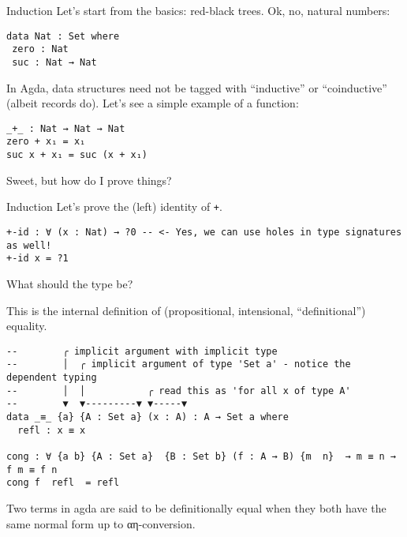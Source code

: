 \documentclass[t,aspectratio=169,9pt]{beamer}
\begin{document}
\begin{frame}{Induction}
  Let's start from the basics: red-black trees. Ok, no, natural numbers:
\begin{verbatim}
data Nat : Set where
 zero : Nat
 suc : Nat → Nat
\end{verbatim}
  In Agda, data structures need not be tagged with ``inductive'' or
  ``coinductive'' (albeit records do).
  Let's see a simple example of a function:
\begin{verbatim}
_+_ : Nat → Nat → Nat
zero + x₁ = x₁
suc x + x₁ = suc (x + x₁)
\end{verbatim}
  Sweet, but how do I prove things?
\end{frame}

\begin{frame}[fragile]{Induction}
  Let's prove the (left) identity of \texttt{+}.
\begin{verbatim}
+-id : ∀ (x : Nat) → ?0 -- <- Yes, we can use holes in type signatures as well!
+-id x = ?1
\end{verbatim}
What should the type be?

This is the internal definition of (propositional, intensional, ``definitional'') equality.
\begin{verbatim}
--        ╭ implicit argument with implicit type
--        │  ╭ implicit argument of type 'Set a' - notice the dependent typing
--        │  │           ╭ read this as 'for all x of type A'
--        ▼  ▼---------▼ ▼-----▼
data _≡_ {a} {A : Set a} (x : A) : A → Set a where
  refl : x ≡ x

cong : ∀ {a b} {A : Set a}  {B : Set b} (f : A → B) {m  n}  → m ≡ n → f m ≡ f n
cong f  refl  = refl
\end{verbatim}
Two terms in agda are said to be definitionally equal when they both have the
same normal form up to αη-conversion.
\end{frame}
\end{document}
